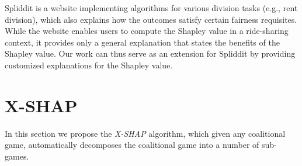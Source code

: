 \documentclass[letterpaper]{article} %
\begin{document}

Spliddit \cite{Goldman14spliddit:unleashing} is a website implementing algorithms for various division tasks (e.g., rent division), which also explains how the outcomes satisfy certain fairness requisites.
While the website enables users to compute the Shapley value in a ride-sharing context, it provides only a general explanation that states the benefits of the Shapley value.
Our work can thus serve as an extension for Spliddit by providing customized explanations for the Shapley value.






\section{X-SHAP}
In this section we propose the \textit{X-SHAP} algorithm, %
which given any coalitional game, automatically decomposes the coalitional game into a number of sub-games. %
\end{document}
